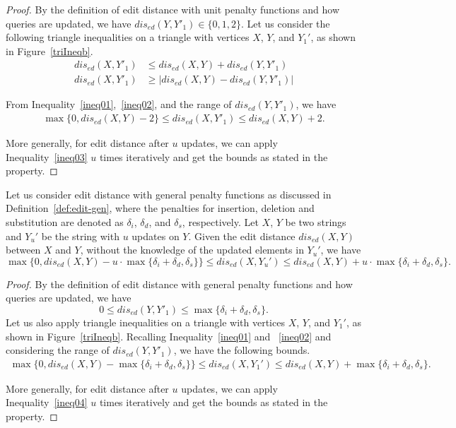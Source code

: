 \begin{proof}
By the definition of edit distance with unit penalty functions and how queries are updated, we have $dis_{ed}(Y, Y'_1)\in \{0,1,2\}$. Let us consider the following triangle inequalities on a triangle with vertices $X$, $Y$, and $Y_1'$, as shown in Figure~\ref{triIneqb}. 
\begin{align}
dis_{ed}(X, Y'_1) &\leq dis_{ed}(X, Y) + dis_{ed}(Y, Y'_1) \label{ineq01}\\
dis_{ed}(X, Y'_1) &\geq |dis_{ed}(X, Y)-dis_{ed}(Y, Y'_1)| \label{ineq02}
\end{align}

From Inequality~\ref{ineq01},~\ref{ineq02}, and the range of $dis_{ed}(Y, Y'_1)$, we have 
\begin{align}\label{ineq03}
\max\{0, dis_{ed}(X, Y) - 2\} \leq dis_{ed}(X, Y'_1) \leq dis_{ed}(X, Y) + 2.
\end{align}

More generally, for edit distance after $u$ updates, we can apply Inequality~\ref{ineq03} $u$ times iteratively and get the bounds as stated in the property.
\end{proof}

\begin{property}\label{ppt:bound-ed-gen}

Let us consider edit distance with general penalty functions as discussed in Definition~\ref{def:edit-gen}, where the penalties for insertion, deletion and substitution are denoted as $\delta_i$, $\delta_d$, and $\delta_s$, respectively.  Let $X$, $Y$ be two strings and $Y_u'$ be the string with $u$ updates on $Y$.  Given the edit distance $dis_{ed}(X, Y)$ between $X$ and $Y$, without the knowledge of the updated elements in $Y_u'$, we have 
$$\max\{0, dis_{ed}(X, Y) - u \cdot \max\{\delta_i + \delta_d, \delta_s\} \} \leq dis_{ed}(X, Y_u') \leq dis_{ed}(X, Y) + u \cdot \max\{\delta_i+\delta_d, \delta_s\}\text{.}$$
\end{property}

\begin{proof}
By the definition of edit distance with general penalty functions and how queries are updated, we have $$0 \leq dis_{ed}(Y, Y'_1)\leq \max\{ \delta_i + \delta_d, \delta_s\}\text{.}$$ Let us also apply triangle inequalities on a triangle with vertices $X$, $Y$, and $Y_1'$, as shown in Figure~\ref{triIneqb}. Recalling Inequality~\ref{ineq01} and ~\ref{ineq02} and considering the range of $dis_{ed}(Y, Y'_1)$, we have the following bounds.     
\begin{align}\label{ineq04}
\max\{0, dis_{ed}(X, Y) - \max\{\delta_i + \delta_d, \delta_s\} \} \leq dis_{ed}(X, Y_1') \leq dis_{ed}(X, Y) + \max\{\delta_i+\delta_d, \delta_s\}\text{.}
\end{align}

More generally, for edit distance after $u$ updates, we can apply Inequality~\ref{ineq04} $u$ times iteratively and get the bounds as stated in the property.
\end{proof}



